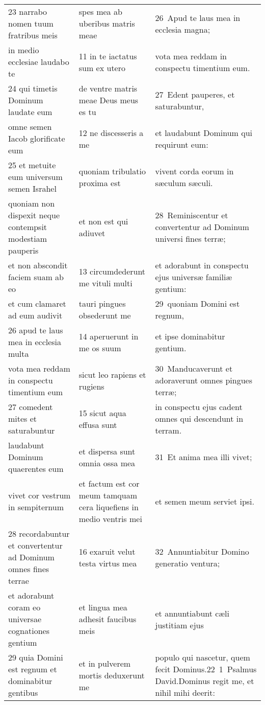 \documentclass{article}
\begin{document}
\begin{longtable}{@{}p{}p{}p{}@{}}
23 narrabo nomen tuum fratribus meis	&	spes mea ab uberibus matris meae	&	26 Apud te laus mea in ecclesia magna;	\\
in medio ecclesiae laudabo te	&	11 in te iactatus sum ex utero	&	vota mea reddam in conspectu timentium eum.	\\
24 qui timetis Dominum laudate eum	&	de ventre matris meae Deus meus es tu	&	27 Edent pauperes, et saturabuntur,	\\
omne semen Iacob glorificate eum	&	12 ne discesseris a me	&	et laudabunt Dominum qui requirunt eum:	\\
25 et metuite eum universum semen Israhel	&	quoniam tribulatio proxima est	&	vivent corda eorum in sæculum sæculi.	\\
quoniam non dispexit neque contempsit modestiam pauperis	&	et non est qui adiuvet	&	28 Reminiscentur et convertentur ad Dominum universi fines terræ;	\\
et non abscondit faciem suam ab eo	&	13 circumdederunt me vituli multi	&	et adorabunt in conspectu ejus universæ familiæ gentium:	\\
et cum clamaret ad eum audivit	&	tauri pingues obsederunt me	&	29 quoniam Domini est regnum,	\\
26 apud te laus mea in ecclesia multa	&	14 aperuerunt in me os suum	&	et ipse dominabitur gentium.	\\
vota mea reddam in conspectu timentium eum	&	sicut leo rapiens et rugiens	&	30 Manducaverunt et adoraverunt omnes pingues terræ;	\\
27 comedent mites et saturabuntur	&	15 sicut aqua effusa sunt	&	in conspectu ejus cadent omnes qui descendunt in terram.	\\
laudabunt Dominum quaerentes eum	&	et dispersa sunt omnia ossa mea	&	31 Et anima mea illi vivet;	\\
vivet cor vestrum in sempiternum	&	et factum est cor meum tamquam cera liquefiens in medio ventris mei	&	et semen meum serviet ipsi.	\\
28 recordabuntur et convertentur ad Dominum omnes fines terrae	&	16 exaruit velut testa virtus mea	&	32 Annuntiabitur Domino generatio ventura;	\\
et adorabunt coram eo universae cognationes gentium	&	et lingua mea adhesit faucibus meis	&	et annuntiabunt cæli justitiam ejus	\\
29 quia Domini est regnum et dominabitur gentibus	&	et in pulverem mortis deduxerunt me	&	populo qui nascetur, quem fecit Dominus.22 1 Psalmus David.Dominus regit me, et nihil mihi deerit:	\\

\end{longtable}
\end{document}
